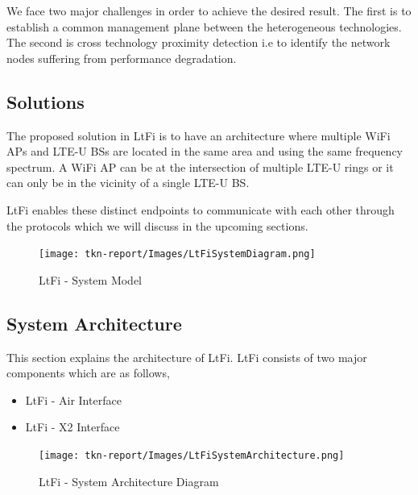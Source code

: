 \documentclass{IEEEtran}
\begin{document}
We face two major challenges in order to achieve the desired result. The first is to establish a common management plane between the heterogeneous technologies. The second is cross technology proximity detection i.e to identify the network nodes suffering from performance degradation.

\subsection{Solutions}
The proposed solution in LtFi is to have an architecture where multiple WiFi APs and LTE-U BSs are located in the same area and using the same frequency spectrum. A WiFi AP can be at the intersection of multiple LTE-U rings or it can only be in the vicinity of a single LTE-U BS.

LtFi enables these distinct endpoints to communicate with each other through the protocols which we will discuss in the upcoming sections.

\graphicspath{{Images/}}
\maketitle
\begin{figure}[htp]
\centering
\texttt{[image: tkn-report/Images/LtFiSystemDiagram.png]}
\caption{LtFi - System Model}
\label{fig:lion}
\end{figure}

\subsection{System Architecture}
This section explains the architecture of LtFi. LtFi consists of two major components which are as follows,

\begin{itemize}
    \item LtFi - Air Interface
    \item LtFi - X2 Interface
\end{itemize}

\graphicspath{{Images/}}
\maketitle
\begin{figure}[htp]
\centering
\texttt{[image: tkn-report/Images/LtFiSystemArchitecture.png]}
\caption{LtFi - System Architecture Diagram}
\label{architecture-diagram}
\end{figure}
\end{document}
